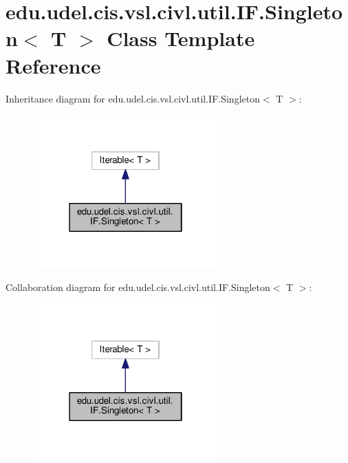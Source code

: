 \hypertarget{classedu_1_1udel_1_1cis_1_1vsl_1_1civl_1_1util_1_1IF_1_1Singleton}{}\section{edu.\+udel.\+cis.\+vsl.\+civl.\+util.\+I\+F.\+Singleton$<$ T $>$ Class Template Reference}
\label{classedu_1_1udel_1_1cis_1_1vsl_1_1civl_1_1util_1_1IF_1_1Singleton}


Inheritance diagram for edu.\+udel.\+cis.\+vsl.\+civl.\+util.\+I\+F.\+Singleton$<$ T $>$\+:
\nopagebreak
\begin{figure}[H]
\begin{center}
\leavevmode
\includegraphics[width=202pt]{classedu_1_1udel_1_1cis_1_1vsl_1_1civl_1_1util_1_1IF_1_1Singleton__inherit__graph}
\end{center}
\end{figure}


Collaboration diagram for edu.\+udel.\+cis.\+vsl.\+civl.\+util.\+I\+F.\+Singleton$<$ T $>$\+:
\nopagebreak
\begin{figure}[H]
\begin{center}
\leavevmode
\includegraphics[width=202pt]{classedu_1_1udel_1_1cis_1_1vsl_1_1civl_1_1util_1_1IF_1_1Singleton__coll__graph}
\end{center}
\end{figure}
